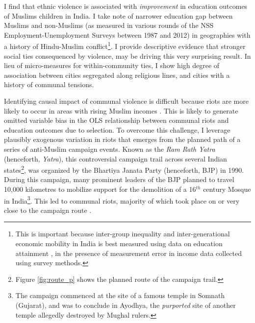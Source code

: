 \documentclass{article}
\begin{document}
I find that ethnic violence is associated with \textit{improvement} in education outcomes of Muslims children in India. I take note of narrower education gap between Muslims and non-Muslims (as measured in various rounds of the NSS Employment-Unemployment Surveys between 1987 and 2012) in geographies with a history of Hindu-Muslim conflict\footnote{This is important because inter-group inequality and inter-generational economic mobility in India is best measured using data on education attainment \citep{asher.2018}, in the presence of measurement error in income data collected using survey methods.}. I provide descriptive evidence that stronger social ties consequenced by violence, may be driving this very surprising result. In lieu of micro-measures for within-community ties, I show high degree of association between cities segregated along religious lines, and cities with a history of communal tensions.

Identifying causal impact of communal violence is difficult because riots are more likely to occur in areas with rising Muslim incomes \citep{mitra.2014}. This is likely to generate omitted variable bias in the OLS relationship between communal riots and education outcomes due to selection. To overcome this challenge, I leverage plausibly exogenous variation in riots that emerges from the planned path of a series of anti-Muslim campaign events. Known as the \textit{Ram Rath Yatra} (henceforth, \emph{Yatra}), this controversial campaign trail across several Indian states\footnote{Figure \ref{fig:route_p} shows the planned route of the campaign trail.}, was organized by the Bhartiya Janata Party (henceforth, BJP) in 1990. During this campaign, many prominent leaders of the BJP planned to travel 10,000 kilometres \citep{mishra.2015} to mobilize support for the demolition of a 16$^{th}$ century Mosque in India\footnote{The campaign commenced at the site of a famous temple in Somnath (Gujarat), and was to conclude in Ayodhya, the \emph{purported} site of another temple allegedly destroyed by Mughal rulers.}. This led to communal riots, majority of which took place on or very close to the campaign route \citep{engineer1991bloody}.
\end{document}
